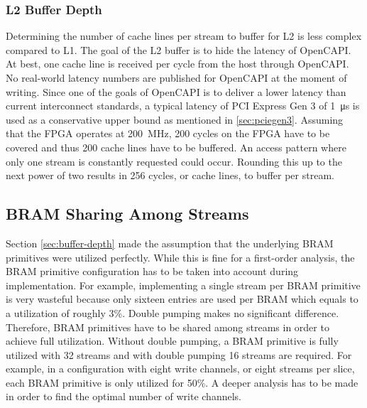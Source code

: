 \subsubsection{L2 Buffer Depth}
\label{sec:l2-buffer-depth}
Determining the number of cache lines per stream to buffer for L2 is less complex compared to L1. The goal of the L2 buffer is to hide the latency of OpenCAPI. At best, one cache line is received per cycle from the host through OpenCAPI.\\
No real-world latency numbers are published for OpenCAPI at the moment of writing. Since one of the goals of OpenCAPI is to deliver a lower latency than current interconnect standards, a typical latency of PCI Express Gen 3 of \SI{1}{\micro\second} is used as a conservative upper bound as mentioned in \ref{sec:pciegen3}. Assuming that the FPGA operates at \SI{200}{\mega\hertz}, 200 cycles on the FPGA have to be covered and thus 200 cache lines have to be buffered. An access pattern where only one stream is constantly requested could occur. Rounding this up to the next power of two results in 256 cycles, or cache lines, to buffer per stream.






\subsection{BRAM Sharing Among Streams}
\label{sec:sharing}
Section \ref{sec:buffer-depth} made the assumption that the underlying BRAM primitives were utilized perfectly. While this is fine for a first-order analysis, the BRAM primitive configuration has to be taken into account during implementation. For example, implementing a single stream per BRAM primitive is very wasteful because only sixteen entries are used per BRAM which equals to a utilization of roughly 3\%. Double pumping makes no significant difference. Therefore, BRAM primitives have to be shared among streams in order to achieve full utilization. Without double pumping, a BRAM primitive is fully utilized with 32 streams and with double pumping 16 streams are required. For example, in a configuration with eight write channels, or eight streams per slice, each BRAM primitive is only utilized for 50\%. A deeper analysis has to be made in order to find the optimal number of write channels.

